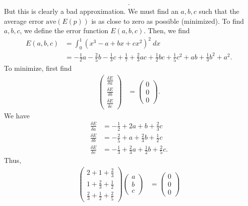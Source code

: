 \documentclass{report}
\begin{document}
\begin{itemize}
\begin{align*}
            .\end{align*}
            But this is clearly a bad approximation. We must find an $a,b,c$ such that the average error $\text{ave}(E(p))$ is as close to zero as possible (minimized).
            \bigbreak \noindent 
            To find $a,b,c$, we define the error function $E(a,b,c)$. Then, we find
            \begin{align*}
                E(a,b,c) &= \int_0^{1}(x^{3} - a + bx + cx^{2})^{2} \ dx \\
                         &=-\frac{1}{2}a -\frac{2}{5}b -\frac{1}{3}c + \frac{1}{7} +\frac{2}{3}ac  +\frac{1}{2}bc  +\frac{1}{5}c^{2} + ab + \frac{1}{3}b^{2} + a^{2}
            .\end{align*}
            To minimize, first find
            \begin{align*}
                \begin{pmatrix}
                    \frac{\delta E}{\delta a} \\ \frac{\delta E}{\delta b} \\ \frac{\delta  E}{\delta c} 
                \end{pmatrix}
                &= \begin{pmatrix}
                    0 \\ 0 \\ 0 
                \end{pmatrix}
            .\end{align*}
            We have
            \begin{align*}
                \frac{\delta E}{\delta a} &= -\frac{1}{2} + 2a + b + \frac{2}{3}c\\
                \frac{\delta E}{\delta b} &= -\frac{2}{5} + a + \frac{2}{3}b + \frac{1}{2}c\\
                \frac{\delta E}{\delta c} &= -\frac{1}{3} + \frac{2}{3}a + \frac{1}{2}b + \frac{2}{5}c
            .\end{align*}
            Thus,
            \begin{align*}
                \begin{pmatrix} 2 + 1 + \frac{2}{3} \\ 1 + \frac{2}{3} +\frac{1}{2} \\ \frac{2}{3} + \frac{1}{2} + \frac{2}{5} \end{pmatrix} \begin{pmatrix}a \\ b \\ c \end{pmatrix} &= \begin{pmatrix} 0 \\ 0 \\ 0 \end{pmatrix}

\end{align*}
\end{itemize}
\end{document}
